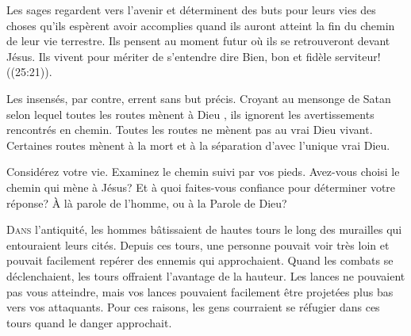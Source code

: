 
Les sages regardent vers l'avenir et déterminent des buts pour leurs vies
 \ocadr des choses qu'ils espèrent avoir accomplies quand ils auront atteint
 la fin du chemin de leur vie terrestre.
 Ils pensent au moment futur où ils se retrouveront devant Jésus.
 Ils vivent pour mériter de s'entendre dire\frcolon{} 
 \Og Bien, bon et fidèle serviteur! \Fg{} ((25:21)).

Les insensés, par contre, errent sans but précis.
 Croyant au mensonge de Satan selon lequel
 \Og toutes les routes mènent à Dieu \Fg{},
 ils ignorent les avertissements rencontrés en chemin.
 Toutes les routes ne mènent pas au vrai Dieu vivant.
 Certaines routes mènent à la mort
 \ocadr et à la séparation d'avec l'unique vrai Dieu.

Considérez votre vie. Examinez le chemin suivi par vos pieds.
 Avez-vous choisi le chemin qui mène à Jésus?
 Et à quoi faites-vous confiance pour déterminer votre réponse?
 À là parole de l'homme, ou à la Parole de Dieu?

\dvrule







\lettrine{D}{ans} l'antiquité, les hommes bâtissaient de hautes tours
 le long des murailles qui entouraient leurs cités.
 Depuis ces tours, une personne pouvait voir très loin et pouvait facilement
 repérer des ennemis qui approchaient.
 Quand les combats se déclenchaient, les tours offraient
 l'avantage de la hauteur. Les lances ne pouvaient pas vous atteindre,
 mais vos lances pouvaient facilement être projetées plus bas
 vers vos attaquants.
 Pour ces raisons, les gens courraient se réfugier dans ces tours
 quand le danger approchait. 


